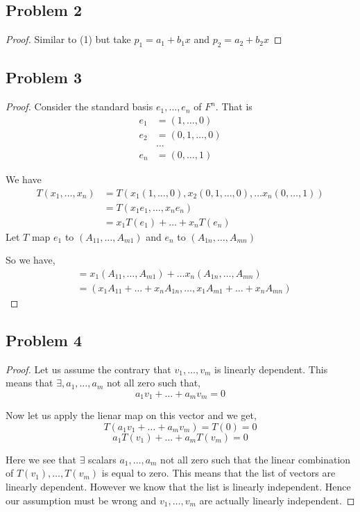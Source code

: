 \documentclass[a4paper]{report}
\begin{document}
\subsection*{Problem 2}

\begin{proof}
    Similar to (1) but take $p_1 = a_1 + b_1x$ and $p_2 = a_2 + b_2x$
\end{proof}


\subsection*{Problem 3}
\begin{proof}
    Consider the standard basis $e_1,\dots,e_n$ of $F^{n}$. That is  
    \begin{align*}
        e_1 &= (1,\dots,0)\\
        e_2 &= (0,1,\dots,0)\\
        &\dots\\
        e_n &= (0,\dots,1)
    \end{align*}

    We have 
    \begin{align*}
        T(x_1,\dots,x_n)  &= T(x_1(1,\dots,0), x_2(0,1,\dots,0),\dots x_n(0,\dots,1))\\
                      &=  T(x_1e_1,\dots,x_ne_n)\\
                      &= x_1T(e_1) + \dots + x_nT(e_n)
    \end{align*}    
    Let $T$ map $e_1$ to $(A_{11},\dots,A_{m1})$ and $e_n$ to $(A_{1n},\dots,A_{mn})$

    So we have, 
    \begin{align*}
        &= x_1(A_{11},\dots,A_{m1}) + \dots x_n(A_{1n},\dots,A_{mn})\\
        &= (x_1A_{11} + \dots + x_nA_{1n}, \dots , x_1A_{m1} + \dots + x_nA_{mn})
    \end{align*}
\end{proof}

\subsection*{Problem 4}
\begin{proof}
    Let us assume the contrary that $v_1,\dots,v_m$ is linearly dependent. This means that $\exists, a_1,\dots,a_m$ not all zero such that, 
    $$ a_1v_1 + \dots + a_mv_m = 0 $$ 

    Now let us apply the lienar map on this vector and we get, 
    $$ T(a_1v_1 + \dots + a_mv_m) = T(0) = 0 $$ 
    $$ a_1T(v_1) + \dots + a_mT(v_m) = 0 $$ 

    Here we see that $\exists$ scalars $a_1,\dots,a_m$ not all zero such that the linear combination of $T(v_1), \dots ,T(v_m)$ is equal to zero. This means that the list of vectors are linearly dependent. However we know that the list is linearly independent. Hence our assumption must be wrong and $v_1,\dots, v_m$ are actually linearly independent.
\end{proof}
\end{document}
